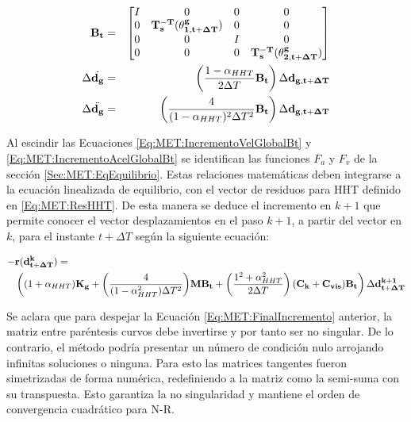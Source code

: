 \begin{eqnarray}
	\label{Eq:MET:DefBt}
	\bf{B}_t & = & \bf{\begin{bmatrix}
			I& 0 & 0 & 0\\ 
			0 & \bf{T_s^{-T}}(\bf{\theta^g_{1,{t+\Delta T}}}) & 0 & 0\\ 
			0& 0 & I & 0\\ 
			0 & 0 & 0 & \bf{T_s^{-T}}(\bf{\theta^g_{2,{t+\Delta T}}})
	\end{bmatrix}}\\
	\label{Eq:MET:IncrementoVelGlobalBt}
	\Delta \dot{\bf{d_g}}&=& \left(\frac{1-\alpha_{HHT}}{2\Delta T} \bf{B_t}\right) \Delta
	\bf{d_{g,{t+\Delta T}}}\\
	\label{Eq:MET:IncrementoAcelGlobalBt}
	\Delta \ddot{\bf{d_g}}&=& \left( \frac{4}{(1-\alpha_{HHT})^2 \Delta T^2} \bf{B_t} \right)\Delta
	\bf{d_{g,{t+\Delta T}}}
\end{eqnarray}	



Al escindir las Ecuaciones \eqref{Eq:MET:IncrementoVelGlobalBt} y \eqref{Eq:MET:IncrementoAcelGlobalBt} se identifican las funciones $F_a$ y $F_v$ de la sección \ref{Sec:MET:EqEquilibrio}. Estas relaciones matemáticas deben integrarse a la ecuación linealizada de equilibrio, con el vector de residuos para HHT definido en   \eqref{Eq:MET:ResHHT}. De esta manera se deduce el incremento en $k+1$ que permite conocer el vector desplazamientos en el paso $k+1$, a partir del vector en $k$, para el instante $t+\Delta T$ según la siguiente ecuación: 

\begin{equation}\label{Eq:MET:FinalIncremento}
	\begin{split}
		-&\bf{r}(\bf{d}^k_{t+\Delta T})=\\
		&\left((1+\alpha_{HHT})\bf{K}_g+\text{$\left( \frac{4}{(1-\alpha_{HHT}^2)\Delta T^2} \right)$} \bf{M}\bf{B}_t + \left(\text{$\frac{1^2+\alpha^2_{HHT}}{2\Delta T}$}\right) (\bf{C}_k+\bf{C}_{vis}) \bf{B}_t \right)\Delta\bf{d}^{k+1}_{t+\Delta T}
	\end{split}
\end{equation}

Se aclara que para despejar la Ecuación \eqref{Eq:MET:FinalIncremento} anterior, la matriz entre paréntesis curvos debe invertirse y por tanto ser no singular. De lo contrario, el método podría presentar un número de condición nulo arrojando infinitas soluciones o ninguna. Para esto las matrices tangentes fueron simetrizadas de forma numérica, redefiniendo a la matriz como la semi-suma con su transpuesta. Esto garantiza la no singularidad y mantiene el orden de convergencia cuadrático para N-R.

